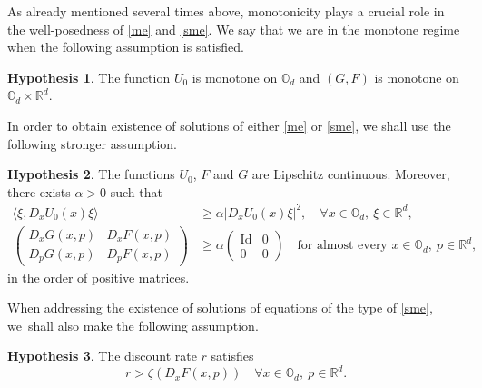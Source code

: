 \documentclass[JEP,XML,SOM,Unicode,NoEqCountersInSection,published]{cedram}
\DeclareMathOperator{\Id}{Id}
\theoremstyle{definition}
\newtheorem{hyp}{Hypothesis}
\begin{document}
As already mentioned several times above, monotonicity plays a crucial role in the well-posedness of \eqref{me} and \eqref{sme}. We say that we are in the monotone regime when the following assumption is satisfied.
\begin{hyp}\label{mon}
The function $U_0$ is monotone on $\mathbb{O}_d$ and $(G,F)$ is monotone on $\mathbb{O}_d \times \mathbb{R}^d$.
\end{hyp}
In order to obtain existence of solutions of either \eqref{me} or \eqref{sme}, we shall use the following stronger assumption.
\begin{hyp}\label{smooth}
The functions $U_0$, $F$ and $G$ are Lipschitz continuous. Moreover, there exists $\alpha > 0$ such that
\begin{align*}
\langle \xi, D_x U_0(x) \xi\rangle &\geq \alpha |D_xU_0(x)\xi|^2,\quad \forall x \in \mathbb{O}_d,\ \xi \in \mathbb{R}^d,
\\
\begin{pmatrix}
D_x G(x,p) & D_x F(x,p) \\
D_p G(x,p) & D_p F(x,p)
\end{pmatrix}&\geq \alpha \begin{pmatrix}
\Id & 0 \\
0 & 0
\end{pmatrix} \quad\text{for almost every } x \in \mathbb{O}_d,\ p \in \mathbb{R}^d,
\end{align*}
in the order of positive matrices.
\end{hyp}
When addressing the existence of solutions of equations of the type of \eqref{sme}, we~shall also make the following assumption.
\begin{hyp}\label{strongstat}
The discount rate $r$ satisfies
\begin{equation*}
r > \zeta(D_xF(x,p))\quad \forall x \in \mathbb{O}_d,\ p \in \mathbb{R}^d.
\end{equation*}
\end{hyp}
\end{document}
